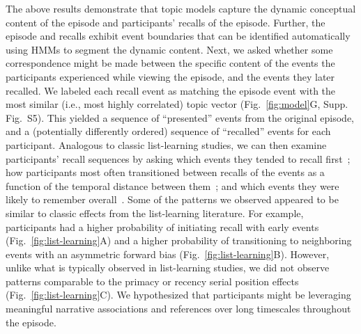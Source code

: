 \documentclass[10pt]{article}
\newcommand{\matchmats}{S5}
\begin{document}
The above results demonstrate that topic models capture the dynamic conceptual content of the episode and participants' recalls of the episode.  Further, the episode and recalls exhibit event boundaries that can be identified automatically using HMMs to segment the dynamic content.  Next, we asked whether some correspondence might be made between the specific content of the events the participants experienced while viewing the episode, and the events they later recalled.  We labeled each recall event as matching the episode event with the most similar (i.e., most highly correlated) topic vector (Fig.~\ref{fig:model}G, Supp. Fig.~\matchmats).  This yielded a sequence of ``presented'' events from the original episode, and a (potentially differently ordered) sequence of ``recalled'' events for each participant.  Analogous to classic list-learning studies, we can then examine participants' recall sequences by asking which events they tended to recall first~\citep[probability of first recall; Fig.~\ref{fig:list-learning}A;][]{AtkiShif68, PostPhil65, WelcBurn24}; how participants most often transitioned between recalls of the events as a function of the temporal distance between them~\citep[lag-conditional response probability; Fig.~\ref{fig:list-learning}B;][]{Kaha96}; and which events they were likely to remember overall~\citep[serial position recall analyses; Fig.~\ref{fig:list-learning}C;][]{Murd62a}. Some of the patterns we observed appeared to be similar to classic effects from the list-learning literature.  For example, participants had a higher probability of initiating recall with early events (Fig.~\ref{fig:list-learning}A) and a higher probability of transitioning to neighboring events with an asymmetric forward bias (Fig.~\ref{fig:list-learning}B). However, unlike what is typically observed in list-learning studies, we did not observe patterns comparable to the primacy or recency serial position effects (Fig.~\ref{fig:list-learning}C).  We hypothesized that participants might be leveraging meaningful narrative associations and references over long timescales throughout the episode.
\end{document}
